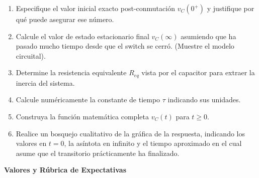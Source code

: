 \documentclass[11pt, a4paper]{article}
\begin{document}
\begin{enumerate}\setlength\itemsep{1.3cm}
    \item Especifique el valor inicial exacto post-conmutación $v_C(0^+)$ y justifique por qué puede asegurar ese número.
    \item Calcule el valor de estado estacionario final $v_C(\infty)$ asumiendo que ha pasado mucho tiempo desde que el switch se cerró. (Muestre el modelo circuital).
    \item Determine la resistencia equivalente $R_{eq}$ vista por el capacitor para extraer la inercia del sistema.
    \item Calcule numéricamente la constante de tiempo $\tau$ indicando sus unidades.
    \item Construya la función matemática completa $v_C(t)$ para $t \ge 0$.
    \item Realice un bosquejo cualitativo de la gráfica de la respuesta, indicando los valores en $t=0$, la asíntota en infinito y el tiempo aproximado en el cual asume que el transitorio prácticamente ha finalizado.
\end{enumerate}

\newpage
\begin{tcolorbox}[colback=gray!10, colframe=black, title=\textbf{Clave Docente - Solucionario Exclusivo}]
    \centering \textbf{Valores y Rúbrica de Expectativas}
\end{tcolorbox}
\end{document}
